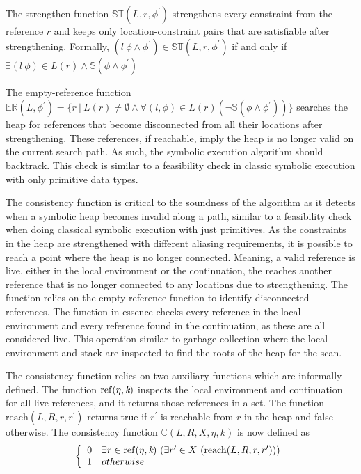 The strengthen function $\mathbb{ST}(L,r,\phi^\prime)$ strengthens every
constraint from the reference $r$ and keeps only location-constraint
pairs that are satisfiable after strengthening. Formally,
$(l\ \phi\wedge\phi^\prime)\in\mathbb{ST}(L,r,\phi^\prime)$ if and
only if $\exists (l\ \phi)\in
L(r)\wedge\mathbb{S}(\phi\wedge\phi^\prime)$

The empty-reference function $\mathbb{ER}(L,\phi^\prime) = \{r\ |\ L(r) \neq
\emptyset \wedge \forall(l,\phi) \in L(r)(\neg \mathbb{S}(\phi \wedge
\phi^\prime))\}$ searches the heap for references that become
disconnected from all their locations after strengthening. These
references, if reachable, imply the heap is no longer valid on the
current search path. As such, the symbolic execution algorithm should
backtrack. This check is similar to a feasibility check in classic
symbolic execution with only primitive data types.

The consistency function is critical to the soundness of the algorithm
as it detects when a symbolic heap becomes invalid along a path,
similar to a feasibility check when doing classical symbolic execution
with just primitives. As the constraints in the heap are strengthened
with different aliasing requirements, it is possible to reach a point
where the heap is no longer connected. Meaning, a valid reference is
live, either in the local environment or the continuation, the reaches
another reference that is no longer connected to any locations due to
strengthening. The function relies on the empty-reference function to
identify disconnected references. The function in essence checks every
reference in the local environment and every reference found in the
continuation, as these are all considered live. This operation similar
to garbage collection where the local environment and stack are
inspected to find the roots of the heap for the scan.


The consistency function relies on two auxiliary functions which are
informally defined. The function $\mathrm{ref}(\eta,\emph{k})$
inspects the local environment and continuation for all live
references, and it returns those references in a set. The function
$\mathrm{reach}(L, R, r, r^\prime)$ returns true if $r^\prime$ is
reachable from $r$ in the heap and false otherwise. The consistency function $\mathbb{C}(L,R,X,\eta,k)$ is now defined as
\[
 \left\{ \begin{array}{rl} 
        0 & \exists r \in \mathrm{ref}(\eta, \emph{k})\ (\exists r^\prime \in X\ (\mathrm{reach}(L, R, r,r^\prime))) \\ 
        1 & \relax{otherwise}\end{array}\right .
\]


